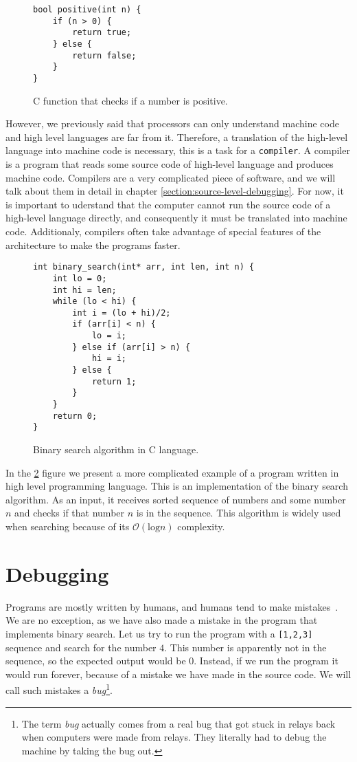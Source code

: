 \begin{figure}\label{fig:c-positive}
\begin{verbatim}
bool positive(int n) {
    if (n > 0) {
        return true;
    } else {
        return false;
    }
}
\end{verbatim}
\caption{C function that checks if a number is positive.}
\end{figure}

However, we previously said that processors can only understand machine code
and high level languages are far from it. Therefore, a translation of the
high-level language into machine code is necessary, this is a task for a
\texttt{compiler}. A compiler is a program that reads some source code of
high-level language and produces machine code. Compilers are a very complicated
piece of software, and we will talk about them in detail in chapter
\ref{section:source-level-debugging}. For now, it is important to uderstand
that the computer cannot run the source code of a high-level language directly,
and consequently it must be translated into machine code. Additionaly,
compilers often take advantage of special features of the architecture to make
the programs faster.

\begin{figure}[H]\label{fig:binary-search}
    \begin{verbatim}
int binary_search(int* arr, int len, int n) {
    int lo = 0;
    int hi = len;
    while (lo < hi) {
        int i = (lo + hi)/2;
        if (arr[i] < n) {
            lo = i;
        } else if (arr[i] > n) {
            hi = i;
        } else {
            return 1;
        }
    }
    return 0;
}
    \end{verbatim}
    \caption{Binary search algorithm in C language.}
\end{figure}

In the \ref{fig:binary-search} figure we present a more complicated example of
a program written in high level programming language. This is an implementation
of the binary search algorithm. As an input, it receives sorted sequence of
numbers and some number $n$ and checks if that number $n$ is in the sequence.
This algorithm is widely used when searching because of its
$\mathcal{O}(\text{log} n)$ complexity.

\section{Debugging}
Programs are mostly written by humans, and humans tend to make
mistakes~\cite{human-error}. We are no exception, as we have also made a
mistake in the program that implements binary search. Let us try to run the
program with a \texttt{[1,2,3]} sequence and search for the number $4$. This
number is apparently not in the sequence, so the expected output would be $0$.
Instead, if we run the program it would run forever, because of a mistake we
have made in the source code. We will call such mistakes a
\textit{bug}\footnote{The term \textit{bug} actually comes from a real bug that
got stuck in relays back when computers were made from relays. They literally
had to debug the machine by taking the bug out.}.

